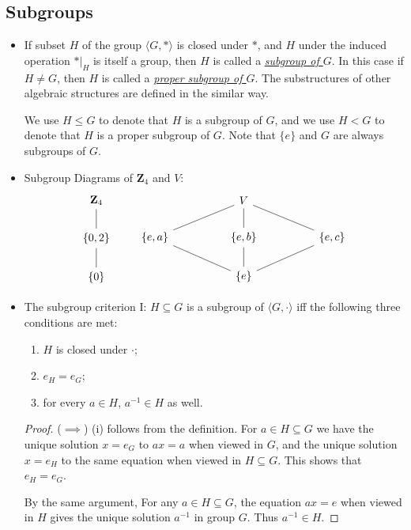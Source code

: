 \documentclass[11pt]{article}
\newcommand{\Z}{\mathbf{Z}}
\newcommand{\df}[1]{\ul{\textit{\textsf{#1}}}}
\newcommand{\la}{\langle}
\newcommand{\ra}{\rangle}
\begin{document}
\subsection{Subgroups}
\begin{itemize}
    \item If subset $H$ of the group $\la G,\ast \ra$ is closed under $\ast$, and $H$ under the induced operation $\ast|_H$ is itself a group, then $H$ is called a \df{subgroup of $G$}. In this case if $H \neq G$, then $H$ is called a \df{proper subgroup of $G$}. The substructures of other algebraic structures are defined in the similar way.

    We use $H \leq G$ to denote that $H$ is a subgroup of $G$, and we use $H < G$ to denote that $H$ is a proper subgroup of $G$. Note that $\{e\}$ and $G$ are always subgroups of $G$.
    \item Subgroup Diagrams of $\Z_4$ and $V$:
    \[\begin{tikzcd}
\Z_4 \arrow[d, no head] \\
{\{0,2\}} \arrow[d, no head] \\
\{0\}                          
\end{tikzcd} \qquad \begin{tikzcd}
&  & V \arrow[d, no head] \arrow[lld, no head] \arrow[rrd, no head] &  &\\
{\{e,a\}} \arrow[rrd, no head] &  & {\{e,b\}} \arrow[d, no head] &  & {\{e,c\}} \arrow[lld, no head] \\ &  & \{e\} &  &
\end{tikzcd}\]
    \item The subgroup criterion I: $H \subseteq G$ is a subgroup of $\la G,\cdot \ra$ iff the following three conditions are met:
    \begin{enumerate}[label=(\roman*)]
        \item $H$ is closed under $\cdot$;
        \item $e_H = e_G$;
        \item for every $a \in H$, $a^{-1} \in H$ as well.
    \end{enumerate}
    \begin{proof}
        ($\implies$) (i) follows from the definition. For $a \in H \subseteq G$ we have the unique solution $x = e_G$ to $ax = a$ when viewed in $G$, and the unique solution $x = e_H$ to the same equation when viewed in $H \subseteq G$. This shows that $e_H = e_G$.

        By the same argument, For any $a \in H \subseteq G$, the equation $ax = e$ when viewed in $H$ gives the unique solution $a^{-1}$ in group $G$. Thus $a^{-1} \in H$.


\end{proof}
\end{itemize}
\end{document}
